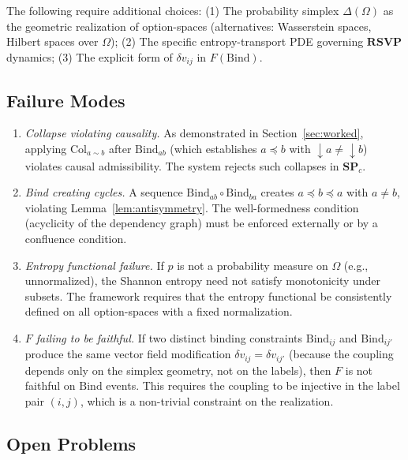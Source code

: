 \documentclass[12pt,a4paper]{article}
\theoremstyle{definition}
\theoremstyle{remark}
\newcommand{\SP}{\mathbf{SP}}
\newcommand{\RSVP}{\mathbf{RSVP}}
\newcommand{\Bind}{\mathrm{Bind}}
\newcommand{\Col}{\mathrm{Col}}
\newcommand{\vF}{v}
\newcommand{\downset}[1]{\!\downarrow\!{#1}}
\begin{document}
The following require additional choices:
(1) The probability simplex $\Delta(\Omega)$ as the geometric realization of option-spaces
(alternatives: Wasserstein spaces, Hilbert spaces over $\Omega$);
(2) The specific entropy-transport PDE governing $\RSVP$ dynamics;
(3) The explicit form of $\delta\vF_{ij}$ in $F(\Bind)$.

\subsection{Failure Modes}

\begin{enumerate}[label=(\roman*)]
\item \textit{Collapse violating causality.} As demonstrated in
  Section~\ref{sec:worked}, applying $\Col_{a\sim b}$ after $\Bind_{ab}$ (which
  establishes $a\preceq b$ with $\downset{a}\ne\downset{b}$) violates causal
  admissibility. The system rejects such collapses in $\SP_c$.
\item \textit{Bind creating cycles.} A sequence $\Bind_{ab}\circ\Bind_{ba}$ creates
  $a\preceq b\preceq a$ with $a\ne b$, violating Lemma~\ref{lem:antisymmetry}. The
  well-formedness condition (acyclicity of the dependency graph) must be enforced
  externally or by a confluence condition.
\item \textit{Entropy functional failure.} If $p$ is not a probability measure on
  $\Omega$ (e.g., unnormalized), the Shannon entropy need not satisfy monotonicity
  under subsets. The framework requires that the entropy functional be consistently
  defined on all option-spaces with a fixed normalization.
\item \textit{$F$ failing to be faithful.} If two distinct binding constraints
  $\Bind_{ij}$ and $\Bind_{ij'}$ produce the same vector field modification
  $\delta\vF_{ij}=\delta\vF_{ij'}$ (because the coupling depends only on the simplex
  geometry, not on the labels), then $F$ is not faithful on $\Bind$ events. This
  requires the coupling to be injective in the label pair $(i,j)$, which is a
  non-trivial constraint on the realization.
\end{enumerate}

\subsection{Open Problems}
\end{document}
